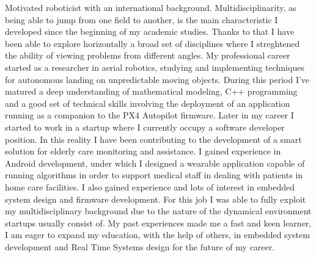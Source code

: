 

\begin{cvparagraph}
    Motivated roboticist with an international background. Multidisciplinarity, as being able to jump from one field to another, is the main characteristic I developed since the beginning of my academic studies.
    Thanks to that I have been able to explore horizontally a broad set of disciplines where I streghtened the ability of viewing problems from different angles. My professional career started as a researcher in aerial robotics, studying and implementing techniques for autonomous landing on unpredictable moving objects. 
    During this period I've matured a deep understanding of mathematical modeling, C++ programming and a good set of technical skills involving the deployment of an application running as a companion to the PX4 Autopilot firmware. 
    Later in my career I started to work in a startup where I currently occupy a software developer position. In this reality I have been contributing to the development of a smart solution for elderly care monitoring and assistance. I gained experience in Android development, under which I designed a wearable application capable of running algorithms in order to support 
    medical staff in dealing with patients in home care facilities. I also gained experience and lots of interest in embedded system design and firmware development. For this job I was able to fully exploit my multidisciplinary background due to the nature of the dynamical environment startups usually consist of.
    My past experiences made me a fast and keen learner, I am eager to expand my education, with the help of others, in embedded system development and Real Time Systems design for the future of my career.
\end{cvparagraph}
